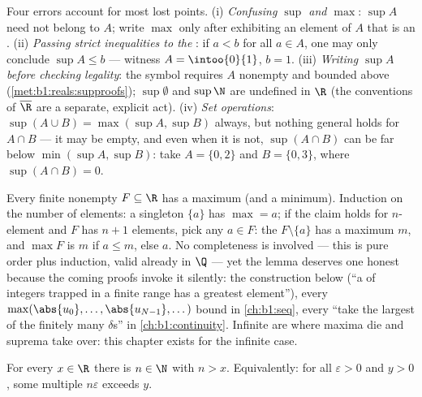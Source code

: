 \begin{remark}
Four errors account for most lost points. (i) \emph{Confusing
$\sup$ and $\max$}: $\sup A$ need not belong to $A$; write $\max$
only after exhibiting an element of $A$ that is an .
(ii) \emph{Passing strict inequalities to the }: if $a <
b$ for all $a \in A$, one may only conclude $\sup A \leq b$ ---
witness $A = \intoo{0}{1}$, $b = 1$. (iii) \emph{Writing $\sup A$
before checking legality}: the symbol requires $A$ nonempty and
bounded above (\cref{met:b1:reals:supproofs}); $\sup \emptyset$
and $\sup \N$ are undefined in $\R$ (the conventions of
$\overline\R$ are a separate, explicit act). (iv) \emph{Set
operations}: $\sup(A \cup B) = \max(\sup A, \sup B)$ always, but
nothing general holds for $A \cap B$ --- it may be empty, and
even when it is not, $\sup(A \cap B)$ can be far below
$\min(\sup A, \sup B)$: take $A = \{0, 2\}$ and $B = \{0, 3\}$,
where $\sup(A \cap B) = 0$.
\end{remark}

\begin{example}\label{ex:b1:reals:finitemax}
Every finite nonempty $F \subseteq \R$ has a maximum (and a
minimum). Induction on the number of elements: a singleton
$\{a\}$ has $\max = a$; if the claim holds for $n$-element 
and $F$ has $n + 1$ elements, pick any $a \in F$: the  $F
\setminus \{a\}$ has a maximum $m$, and $\max F$ is $m$ if $a
\leq m$, else $a$. No completeness is involved --- this is pure
order plus induction, valid already in $\Q$ --- yet the lemma
deserves one honest  because the coming proofs invoke
it silently: the  construction below (``a  of integers
trapped in a finite range has a greatest element''), every
$\max(\abs{u_0}, \dots, \abs{u_{N-1}}, \dots)$ bound in
\cref{ch:b1:seq}, every ``take the largest of the finitely many
$\delta$s'' in \cref{ch:b1:continuity}. Infinite  are where
maxima die and suprema take over: this chapter exists for the
infinite case.
\end{example}

\begin{theorem}\label{thm:b1:reals:archimedes}
For every $x \in \R$ there is $n \in \N$ with $n > x$. Equivalently:
for all $\varepsilon > 0$ and $y > 0$, some multiple $n\varepsilon$
exceeds $y$.
\end{theorem}

